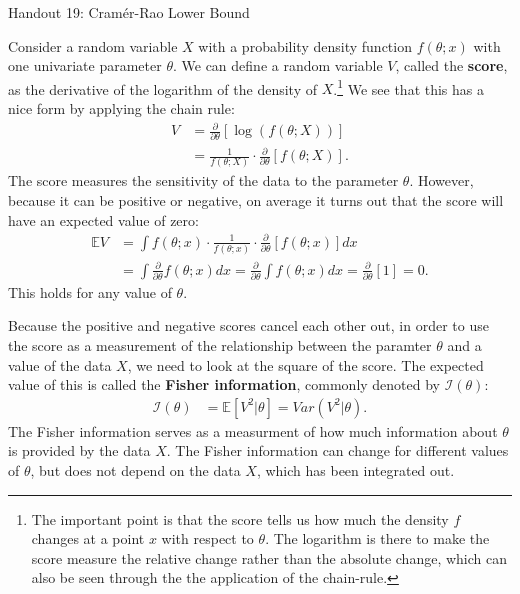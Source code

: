 \documentclass{tufte-handout}
\begin{document}
\justify

{\LARGE Handout 19: Cramér-Rao Lower Bound}

\vspace*{18pt}

\noindent
Consider a random variable $X$ with a probability density function 
$f(\theta; x)$ with one univariate parameter $\theta$. We
can define a random variable $V$, called the \textbf{score},
as the derivative of the logarithm of the density of $X$.\footnote{
  The important point is that the score tells us how much the density
  $f$ changes at a point $x$ with respect to $\theta$. The logarithm
  is there to make the score measure the relative change rather than
  the absolute change, which can also be seen through the the application
  of the chain-rule.
}
We see that this has a nice form by applying the chain rule:
\begin{align*}
V &= \frac{\partial}{\partial \theta} \left[ \log(f(\theta; X)) \right] \\
&= \frac{1}{f(\theta; X)} \cdot \frac{\partial}{\partial \theta} \left[ f(\theta; X) \right].
\end{align*}
The score measures the sensitivity of the data to the parameter $\theta$.
However, because it can be positive or negative, on average it turns out
that the score will have an expected value of zero:
\begin{align*}
\mathbb{E} V &= \int f(\theta; x) \cdot \frac{1}{f(\theta; x)} \cdot \frac{\partial}{\partial \theta} \left[ f(\theta; x) \right] dx \\
&= \int \frac{\partial}{\partial \theta} f(\theta; x) dx =
\frac{\partial}{\partial \theta} \int f(\theta; x) dx = \frac{\partial}{\partial \theta} \left[1\right] = 0.
\end{align*}
This holds for any value of $\theta$. 

Because the positive and negative scores cancel each other out,
in order to use the score as a measurement of the relationship
between the paramter $\theta$ and a value of the data $X$, we
need to look at the square of the score. The expected value of
this is called the \textbf{Fisher information}, commonly denoted
by $\mathcal{I}(\theta)$:
\begin{align*}
\mathcal{I}(\theta) &= \mathbb{E}[V^2|\theta] = Var(V^2 | \theta).
\end{align*}
The Fisher information serves as a measurment of how much information
about $\theta$ is provided by the data $X$. The Fisher information can
change for different values of $\theta$, but does not depend on the
data $X$, which has been integrated out.
\end{document}
